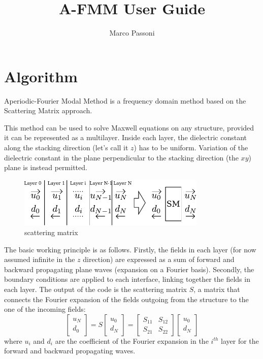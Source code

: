 \documentclass[a4paper,10pt]{report}
\title{A-FMM User Guide}
\author{Marco Passoni}
\date{}
\begin{document}
\maketitle

\tableofcontents

\chapter{Algorithm} 

Aperiodic-Fourier Modal Method is a frequency domain method based on the Scattering Matrix approach. 

This method can be used to solve Maxwell equations on any structure, provided it can be represented as a multilayer. Inside each layer, the dielectric constant along the stacking direction (let's call it $z$) has to be uniform. Variation of the dielectric constant in the plane perpendicular to the stacking direction (the $xy$) plane is instead permitted.

\begin{figure}
\centering
\includegraphics[width=0.8\textwidth]{figures/SM.pdf}
\caption{scattering matrix}
\label{fig:SM}
\end{figure} 

The basic working principle is as follows. Firstly, the fields in each layer (for now assumed infinite in the $z$ direction) are expressed as a sum of forward and backward propagating plane waves (expansion on a Fourier basis). Secondly, the boundary conditions are applied to each interface, linking together the fields in each layer. The output of the code is the scattering matrix $S$, a matrix that connects the Fourier expansion of the fields outgoing from the structure to the one of the incoming fields:
\begin{equation} \label{eq:SM_def}
\left[ \begin{array}{c} u_N \\ d_0 \end{array} \right] =
S \left[ \begin{array}{c} u_0 \\ d_N \end{array} \right] = \left[ \begin{array}{cc} S_{11} & S_{12} \\ S_{21} & S_{22} \end{array} \right] \left[ \begin{array}{c} u_0 \\ d_N \end{array} \right]
\end{equation}  
where $u_i$ and $d_i$ are the coefficient of the Fourier expansion in the $i^{th}$ layer for the forward and backward propagating waves. 
\end{document}
